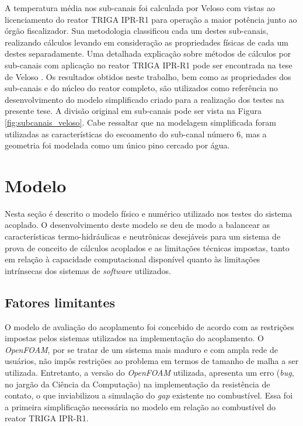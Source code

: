 A temperatura média nos sub-canais foi calculada por Veloso \cite[Capítulo~8]{Veloso2005} com vistas ao licenciamento
do reator TRIGA IPR-R1 para operação a maior potência junto ao órgão fiscalizador. Sua metodologia
classificou cada um destes sub-canais, realizando cálculos levando
em consideração as propriedades físicas de cada um destes separadamente. Uma detalhada
explicação sobre métodos de cálculos por sub-canais com aplicação no reator TRIGA IPR-R1
pode ser encontrada na tese de Veloso \cite{Veloso2004}. Os resultados obtidos neste
trabalho, bem como as propriedades dos sub-canais e do núcleo do reator completo, são utilizados
como referência no desenvolvimento do modelo simplificado criado para a realização dos testes na
presente tese. A divisão original em sub-canais pode ser vista na Figura \ref{fig:subcanais_veloso}. Cabe
ressaltar que na modelagem simplificada foram utilizadas as características do escoamento do
sub-canal número $6$, mas a geometria foi modelada como um único pino cercado por água.

\section{Modelo}
%
%

Nesta seção é descrito o modelo físico e numérico utilizado nos testes do sistema acoplado.
O desenvolvimento deste modelo se deu de modo a balancear as características termo-hidráulicas
e neutrônicas desejáveis para um sistema de prova de conceito de cálculos acoplados
e as limitações técnicas impostas, tanto em relação à capacidade computacional disponível quanto
às limitações intrínsecas dos sistemas de \textit{software} utilizados.

\subsection{Fatores limitantes}
\label{ssec:lim}

O modelo de avaliação do acoplamento foi concebido de acordo com as restrições impostas pelos sistemas
utilizados na implementação do acoplamento. O \textit{OpenFOAM}, por se tratar de um sistema mais maduro
e com ampla rede de usuários, não impôs
restrições ao problema em termos de tamanho de malha a ser utilizada. Entretanto, a versão
do \textit{OpenFOAM} utilizada,
apresenta um erro (\textit{bug}, no jargão da Ciência da Computação) na implementação da resistência
de contato, o que inviabilizou a simulação do \textit{gap} existente no combustível. Essa foi a
primeira simplificação necessária no modelo em relação ao combustível do reator TRIGA IPR-R1.

